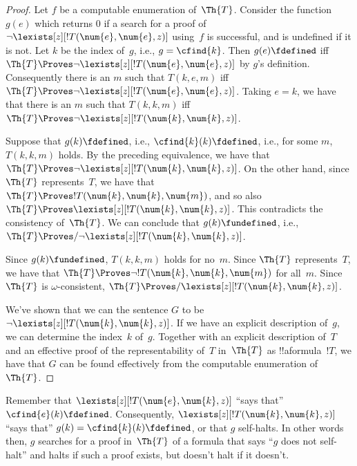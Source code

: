 \documentclass[../../../include/open-logic-section]{subfiles}
\begin{document}
\begin{proof}
  Let $f$ be a computable enumeration of~$\Th{T}$. Consider the
  function~$g(e)$ which returns $0$ if a search for a proof of
  $\lnot\lexists[z][!T(\num{e}, \num{e}, z)]$ using~$f$ is successful,
  and is undefined if it is not. Let $k$ be the index of~$g$, i.e., $g
  = \cfind{k}$. Then $g(e) \fdefined$ iff $\Th{T} \Proves
  \lnot\lexists[z][!T(\num{e}, \num{e}, z)]$ by $g$'s definition.
  Consequently there is an $m$ such that $T(k, e, m)$ iff $\Th{T}
  \Proves \lnot\lexists[z][!T(\num{e}, \num{e}, z)]$. Taking $e = k$,
  we have that there is an $m$ such that $T(k, k, m)$ iff $\Th{T}
  \Proves \lnot\lexists[z][!T(\num{k}, \num{k}, z)]$.

  Suppose that $g(k) \fdefined$, i.e., $\cfind{k}(k) \fdefined$, i.e.,
  for some $m$, $T(k, k, m)$ holds. By the preceding equivalence, we
  have that $\Th{T} \Proves \lnot\lexists[z][!T(\num{k}, \num{k},
  z)]$. On the other hand, since $\Th{T}$ represents~$T$, we have that
  $\Th{T} \Proves !T(\num{k}, \num{k}, \num{m})$, and so also $\Th{T}
  \Proves \lexists[z][!T(\num{k}, \num{k}, z)]$. This contradicts the
  consistency of~$\Th{T}$. We can conclude that $g(k) \fundefined$,
  i.e., $\Th{T} \Proves/ \lnot\lexists[z][!T(\num{k}, \num{k}, z)]$.

  Since $g(k) \fundefined$, $T(k, k, m)$ holds for no~$m$. Since
  $\Th{T}$ represents~$T$, we have that $\Th{T} \Proves \lnot
  !T(\num{k}, \num{k}, \num{m})$ for all~$m$. Since $\Th{T}$ is
  $\omega$-consistent, $\Th{T} \Proves/ \lexists[z][!T(\num{k},
  \num{k}, z)]$.

  We've shown that we can the sentence $G$ to be
  $\lnot\lexists[z][!T(\num{k}, \num{k}, z)]$. If we have an explicit
  description of~$g$, we can determine the index~$k$ of~$g$. Together
  with an explicit description of~$T$ and an effective proof of the
  representability of~$T$ in~$\Th{T}$ as !!a{formula}~$!T$, we have
  that $G$ can be found effectively from the computable enumeration
  of~$\Th{T}$.
\end{proof}

Remember that $\lexists[z][!T(\num{e}, \num{k}, z)]$ ``says that''
$\cfind{e}(k)\fdefined$. Consequently, $\lexists[z][!T(\num{k},
\num{k}, z)]$ ``says that'' $g(k) = \cfind{k}(k)\fdefined$, or that
$g$ self-halts. In other words then, $g$ searches for a proof
in~$\Th{T}$ of a formula that says ``$g$ does not self-halt'' and
halts if such a proof exists, but doesn't halt if it doesn't. 
\end{document}

